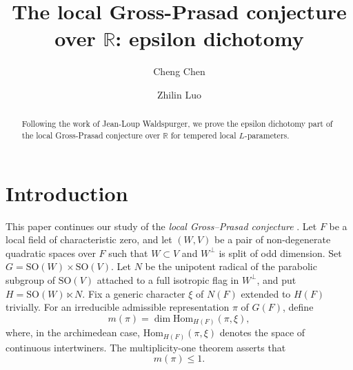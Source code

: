 \documentclass[12pt]{amsart}
\numberwithin{equation}{subsection}
\newcommand{\BR}{{\mathbb {R}}}
\newcommand{\Hom}{{\mathrm{Hom}}}
\newcommand{\SO}{{\mathrm{SO}}}
\def\SO{\mathrm{SO}}
\begin{document}
\title[The local Gross-Prasad conjecture over $\BR$: epsilon dichotomy]{The local Gross-Prasad conjecture over $\BR$: epsilon dichotomy}


\author{Cheng Chen}
\address{IMJ-PRG, CNRS\\8 place Aurélie Nemours, 75013, Paris, France
}

\author{Zhilin Luo}
\address{Department of Mathematics\\
Purdue University\\
West Lafayette, IN 47907, USA}


\begin{abstract}
Following the work of Jean-Loup Waldspurger, we prove the epsilon dichotomy part of the local Gross-Prasad conjecture over $\BR$ for tempered local $L$-parameters.
\end{abstract}

\maketitle

\tableofcontents

\section{Introduction}\label{sec:intro}

This paper continues our study of the \emph{local Gross--Prasad conjecture}
\cite{MR1186476,MR1295124}. Let $F$ be a local field of characteristic zero,
and let $(W,V)$ be a pair of non-degenerate quadratic spaces over $F$ such that $
W\subset V$ and $W^\perp$ is split of odd dimension.
Set $
G=\SO(W)\times \SO(V).$
Let $N$ be the unipotent radical of the parabolic subgroup of $\SO(V)$ attached
to a full isotropic flag in $W^\perp$, and put
$
H=\SO(W)\ltimes N.
$
Fix a generic character $\xi$ of $N(F)$ extended to $H(F)$ trivially. For an irreducible admissible representation $\pi$ of
$G(F)$, define
\begin{equation}\label{eq:intro:1}
m(\pi)=\dim \Hom_{H(F)}(\pi,\xi),
\end{equation}
where, in the archimedean case, $\Hom_{H(F)}(\pi,\xi)$ denotes the space of
continuous intertwiners. The multiplicity-one theorem
\cite{agrsmut1,ggporiginal,MR3202559,szmut1,MR2720228} asserts that
\[
m(\pi)\leq 1.
\]
\end{document}
